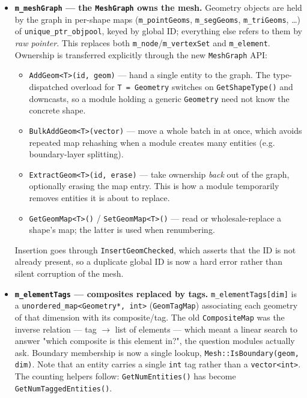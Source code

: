 \begin{itemize}
  \item \textbf{\texttt{m\_meshGraph} --- the \texttt{MeshGraph} owns
    the mesh.} Geometry objects are held by the graph in per-shape
    maps (\texttt{m\_pointGeoms}, \texttt{m\_segGeoms},
    \texttt{m\_triGeoms}, \ldots) of \texttt{unique\_ptr\_objpool},
    keyed by global ID; everything else refers to them by \textit{raw
    pointer}. This replaces both \texttt{m\_node}/\texttt{m\_vertexSet}
    and \texttt{m\_element}. Ownership is transferred explicitly
    through the new \texttt{MeshGraph} API:

    \begin{itemize}
      \item \texttt{AddGeom<T>(id, geom)} --- hand a single entity to
        the graph. The type-dispatched overload for \texttt{T =
        Geometry} switches on \texttt{GetShapeType()} and downcasts,
        so a module holding a generic \texttt{Geometry} need not know
        the concrete shape.
      \item \texttt{BulkAddGeom<T>(vector)} --- move a whole batch in
        at once, which avoids repeated map rehashing when a module
        creates many entities (e.g. boundary-layer splitting).
      \item \texttt{ExtractGeom<T>(id, erase)} --- take ownership
        \textit{back} out of the graph, optionally erasing the map
        entry. This is how a module temporarily removes entities it is
        about to replace.
      \item \texttt{GetGeomMap<T>()} / \texttt{SetGeomMap<T>()} ---
        read or wholesale-replace a shape's map; the latter is used
        when renumbering.
    \end{itemize}

    Insertion goes through \texttt{InsertGeomChecked}, which asserts
    that the ID is not already present, so a duplicate global ID is now
    a hard error rather than silent corruption of the mesh.

  \item \textbf{\texttt{m\_elementTags} --- composites replaced by
    tags.} \texttt{m\_elementTags[dim]} is a
    \texttt{unordered\_map<Geometry*, int>} (\texttt{GeomTagMap})
    associating each geometry of that dimension with its
    composite/tag. The old \texttt{CompositeMap} was the inverse
    relation --- tag $\rightarrow$ list of elements --- which meant a
    linear search to answer "which composite is this element in?", the
    question modules actually ask. Boundary membership is now a single
    lookup, \texttt{Mesh::IsBoundary(geom, dim)}. Note that an entity
    carries a single \texttt{int} tag rather than a
    \texttt{vector<int>}. The counting helpers follow:
    \texttt{GetNumEntities()} has become
    \texttt{GetNumTaggedEntities()}.


\end{itemize}
